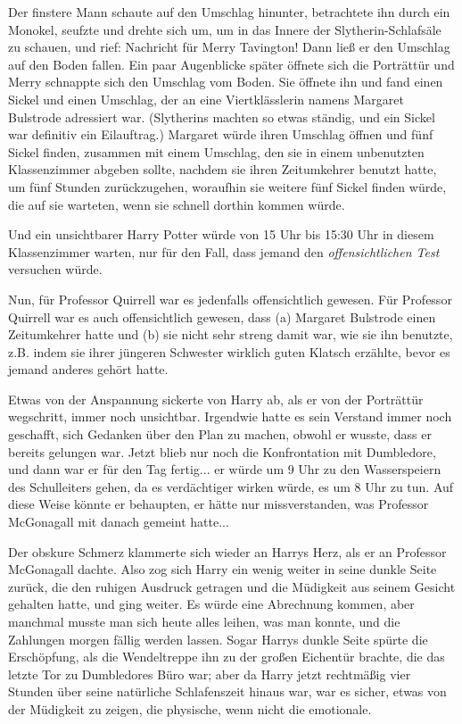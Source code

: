 Der finstere Mann schaute auf den Umschlag hinunter, betrachtete ihn durch ein
Monokel, seufzte und drehte sich um, um in das Innere der Slytherin-Schlafsäle
zu schauen, und rief: \glqq{}Nachricht für Merry Tavington!\grqq{} Dann ließ er
den Umschlag auf den Boden fallen. Ein paar Augenblicke später öffnete sich die
Porträttür und Merry schnappte sich den Umschlag vom Boden. Sie öffnete ihn und
fand einen Sickel und einen Umschlag, der an eine Viertklässlerin namens
Margaret Bulstrode adressiert war. (Slytherins machten so etwas ständig, und ein
Sickel war definitiv ein Eilauftrag.) Margaret würde ihren Umschlag öffnen und
fünf Sickel finden, zusammen mit einem Umschlag, den sie in einem unbenutzten
Klassenzimmer abgeben sollte, nachdem sie ihren Zeitumkehrer benutzt hatte, um
fünf Stunden zurückzugehen, woraufhin sie weitere fünf Sickel finden würde, die
auf sie warteten, wenn sie schnell dorthin kommen würde.

Und ein unsichtbarer Harry Potter würde von 15 Uhr bis 15:30 Uhr in diesem
Klassenzimmer warten, nur für den Fall, dass jemand den \emph{offensichtlichen
Test} versuchen würde.

Nun, für Professor Quirrell war es jedenfalls offensichtlich gewesen. Für
Professor Quirrell war es auch offensichtlich gewesen, dass (a) Margaret
Bulstrode einen Zeitumkehrer hatte und (b) sie nicht sehr streng damit war, wie
sie ihn benutzte, z.B. indem sie ihrer jüngeren Schwester wirklich guten Klatsch
erzählte, \glqq{}bevor\grqq{} es jemand anderes gehört hatte.

Etwas von der Anspannung sickerte von Harry ab, als er von der Porträttür
wegschritt, immer noch unsichtbar. Irgendwie hatte es sein Verstand immer noch
geschafft, sich Gedanken über den Plan zu machen, obwohl er wusste, dass er
bereits gelungen war. Jetzt blieb nur noch die Konfrontation mit Dumbledore, und
dann war er für den Tag fertig... er würde um 9 Uhr zu den Wasserspeiern des
Schulleiters gehen, da es verdächtiger wirken würde, es um 8 Uhr zu tun. Auf
diese Weise könnte er behaupten, er hätte nur missverstanden, was Professor
McGonagall mit \glqq{}danach\grqq{} gemeint hatte...

Der obskure Schmerz klammerte sich wieder an Harrys Herz, als er an Professor
McGonagall dachte. Also zog sich Harry ein wenig weiter in seine dunkle Seite
zurück, die den ruhigen Ausdruck getragen und die Müdigkeit aus seinem Gesicht
gehalten hatte, und ging weiter. Es würde eine Abrechnung kommen, aber manchmal
musste man sich heute alles leihen, was man konnte, und die Zahlungen morgen
fällig werden lassen. Sogar Harrys dunkle Seite spürte die Erschöpfung, als die
Wendeltreppe ihn zu der großen Eichentür brachte, die das letzte Tor zu
Dumbledores Büro war; aber da Harry jetzt rechtmäßig vier Stunden über seine
natürliche Schlafenszeit hinaus war, war es sicher, etwas von der Müdigkeit zu
zeigen, die physische, wenn nicht die emotionale.

